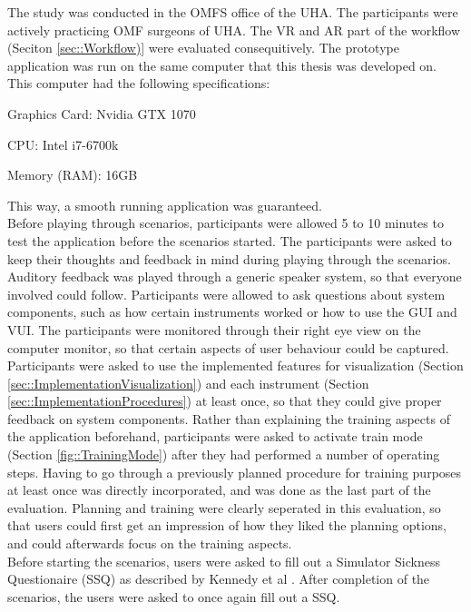 The study was conducted in the OMFS office of the UHA.
The participants were actively practicing OMF surgeons of UHA.
The VR and AR part of the workflow (Seciton \ref{sec::Workflow)} were evaluated consequitively.
The prototype application was run on the same computer that this thesis was developed on.
This computer had the following specifications:

\begin{compactenum}[label=(\alph*)]
    \item Graphics Card: Nvidia GTX 1070
    \item CPU: Intel i7-6700k
    \item Memory (RAM): 16GB
\end{compactenum}

This way, a smooth running application was guaranteed.
\\ Before playing through scenarios, participants were allowed 5 to 10 minutes to test the application before the scenarios started.
The participants were asked to keep their thoughts and feedback in mind during playing through the scenarios.
Auditory feedback was played through a generic speaker system, so that everyone involved could follow.
Participants were allowed to ask questions about system components, such as how certain instruments worked or how to use the GUI and VUI.
The participants were monitored through their right eye view on the computer monitor, so that certain aspects of user behaviour could be captured.
Participants were asked to use the implemented features for visualization (Section \ref{sec::ImplementationVisualization}) and each instrument (Section \ref{sec::ImplementationProcedures}) at least once, so that they could give proper feedback on system components.
Rather than explaining the training aspects of the application beforehand, participants were asked to activate train mode (Section \ref{fig::TrainingMode}) after they had performed a number of operating steps.
Having to go through a previously planned procedure for training purposes at least once was directly incorporated, and was done as the last part of the evaluation.
Planning and training were clearly seperated in this evaluation, so that users could first get an impression of how they liked the planning options, and could afterwards focus on the training aspects.
\\ Before starting the scenarios, users were asked to fill out a Simulator Sickness Questionaire (SSQ) as described by Kennedy et al \cite{kennedy1993simulator}.
After completion of the scenarios, the users were asked to once again fill out a SSQ.
